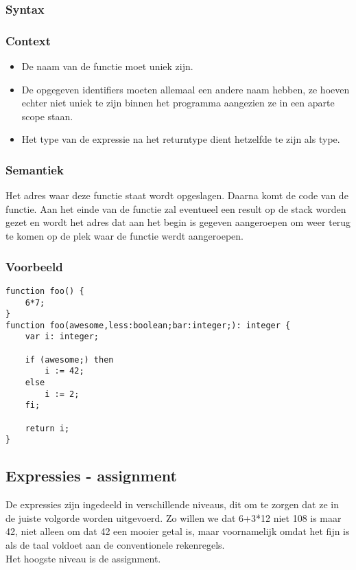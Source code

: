 \documentclass[]{article}
\begin{document}
\subsubsection{Syntax}

\subsubsection{Context}
\begin{itemize}
\item De naam van de functie moet uniek zijn.
\item De opgegeven identifiers moeten allemaal een andere naam hebben, ze hoeven echter niet uniek te zijn binnen het programma aangezien ze in een aparte scope staan.
\item Het type van de expressie na het returntype dient hetzelfde te zijn als type.
\end{itemize}
\subsubsection{Semantiek}
Het adres waar deze functie staat wordt opgeslagen. Daarna komt de code van de functie. Aan het einde van de functie zal eventueel een result op de stack worden gezet en wordt het adres dat aan het begin is gegeven aangeroepen om weer terug te komen op de plek waar de functie werdt aangeroepen.
\subsubsection{Voorbeeld}
\begin{lstlisting}[style=SELMA]
function foo() {
	6*7;
}
function foo(awesome,less:boolean;bar:integer;): integer {
	var i: integer;
	
	if (awesome;) then
		i := 42;
	else
		i := 2;
	fi;
	
	return i;
}
\end{lstlisting}


\subsection{Expressies - assignment}
De expressies zijn ingedeeld in verschillende niveaus, dit om te zorgen dat ze in de juiste volgorde worden uitgevoerd. Zo willen we dat 6+3*12 niet 108 is maar 42, niet alleen om dat 42 een mooier getal is, maar voornamelijk omdat het fijn is als de taal voldoet aan de conventionele rekenregels. \\
Het hoogste niveau is de assignment.
\end{document}
